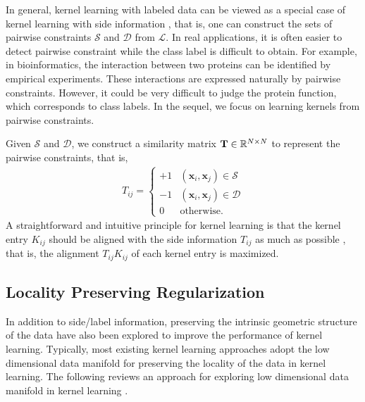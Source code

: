 In general, kernel learning with labeled data can be viewed as a special case of kernel
learning with side information  \cite{icml/Kwok03,icml/KulisSD06,icml/HoiJL07},
that is, one can construct the sets of pairwise constraints $\mathcal{S}$ and
$\mathcal{D}$ from $\mathcal{L}$. In real applications, it is often easier to detect
pairwise constraint while the class label is difficult to obtain. For example, in
bioinformatics, the interaction between two proteins can be identified by empirical
experiments. These interactions are expressed naturally by pairwise constraints.
However, it could be very difficult to judge the protein function, which corresponds
to class labels. In the sequel, we focus on learning kernels from pairwise constraints.

Given $\mathcal{S}$ and $\mathcal{D}$, we construct a similarity matrix ${\bf T} \in
\mathbb{R}^{N\times N}$ to represent the pairwise constraints, that is,
\begin{eqnarray}\label{eqn:side_info}
T_{ij} = \left\{
\begin{array}{cl}
+1 & (\mathbf{x}_i, \mathbf{x}_j) \in \mathcal{S} \\
-1 & (\mathbf{x}_i, \mathbf{x}_j) \in \mathcal{D} \\
0 & \mbox{otherwise.}
\end{array}
\right.
\end{eqnarray}
A straightforward and intuitive principle for kernel learning is that the kernel entry $K_{ij}$ should be
aligned with the side information $T_{ij}$ as much as
possible \cite{nips/CristianiniSEK01}, that is, the alignment $T_{ij}K_{ij}$ of each
kernel entry is maximized.

\subsection{Locality Preserving Regularization}\label{sec:laplace}

In addition to side/label information, preserving the intrinsic geometric structure of
the data have also been explored to improve the performance of kernel learning.
Typically, most existing kernel learning
approaches \cite{icml/KulisSD06,icml/HoiJL07,icml/HoiJ08} adopt the low dimensional data
manifold \cite{icml/SindhwaniNB05} for preserving the locality of the data in
kernel learning. The following reviews an approach for exploring low dimensional data manifold in
kernel learning \cite{icml/HoiJL07}.


